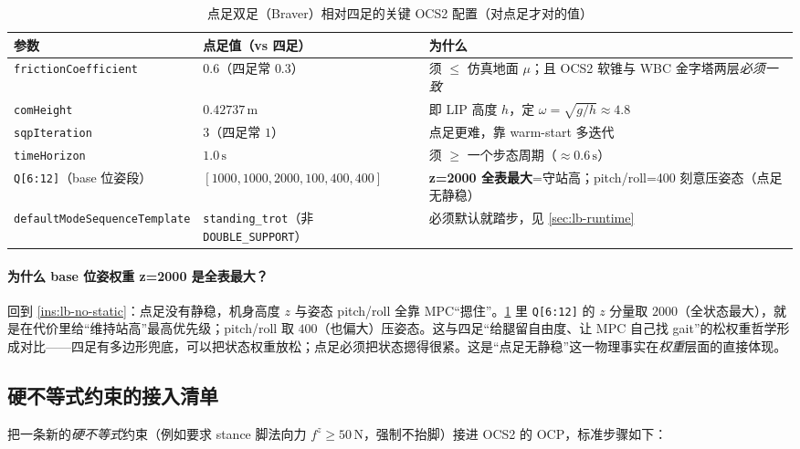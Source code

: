 \begin{table}[H]\centering\small
\caption{点足双足（Braver）相对四足的关键 OCS2 配置（对点足才对的值）}
\begin{tabular}{p{} p{} p{}}
\toprule
参数 & 点足值（vs 四足） & 为什么 \\
\midrule
\texttt{frictionCoefficient} & $0.6$（四足常 $0.3$） & 须 $\le$ 仿真地面 $\mu$；且 OCS2 软锥与 WBC 金字塔两层\emph{必须一致} \\
\texttt{comHeight} & $0.42737\,\mathrm{m}$ & 即 LIP 高度 $h$，定 $\omega=\sqrt{g/h}\approx 4.8$ \\
\texttt{sqpIteration} & $3$（四足常 $1$） & 点足更难，靠 warm-start 多迭代 \\
\texttt{timeHorizon} & $1.0\,\mathrm{s}$ & 须 $\ge$ 一个步态周期（$\approx 0.6\,\mathrm{s}$） \\
\texttt{Q[6:12]}（base 位姿段） & $[1000,1000,2000,100,400,400]$ & \textbf{z=2000 全表最大}=守站高；pitch/roll=400 刻意压姿态（点足无静稳） \\
\texttt{defaultModeSequenceTemplate} & \texttt{standing\_trot}（非 \texttt{DOUBLE\_SUPPORT}） & 必须默认就踏步，见 \cref{sec:lb-runtime} \\
\bottomrule
\end{tabular}
\label{tab:lb-braver-config}
\end{table}

\paragraph{为什么 base 位姿权重 z=2000 是全表最大？}
回到 \cref{ins:lb-no-static}：点足没有静稳，机身高度 $z$ 与姿态 pitch/roll 全靠 MPC“摁住”。\cref{tab:lb-braver-config} 里 \texttt{Q[6:12]} 的 $z$ 分量取 $2000$（全状态最大），就是在代价里给“维持站高”最高优先级；pitch/roll 取 $400$（也偏大）压姿态。这与四足“给腿留自由度、让 MPC 自己找 gait”的松权重哲学形成对比——四足有多边形兜底，可以把状态权重放松；点足必须把状态摁得很紧。这是“点足无静稳”这一物理事实在\emph{权重}层面的直接体现。

\subsection{硬不等式约束的接入清单}
\label{subsec:lb-hard-constraint}

把一条新的\emph{硬不等式}约束（例如要求 stance 脚法向力 $f^z\ge 50\,\mathrm{N}$，强制不抬脚）接进 OCS2 的 OCP，标准步骤如下：

